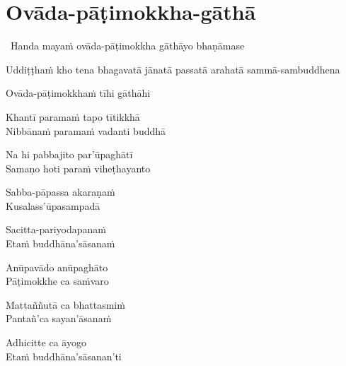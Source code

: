 \section{Ovāda-pāṭimokkha-gāthā}
\label{ovada-patimokkha-gatha}

\begin{intro}
  \anglebracketleft\ \hspace{-0.5mm}Handa mayaṁ ovāda-pāṭimokkha gāthāyo bhaṇāmase \hspace{-0.5mm}\anglebracketright\
\end{intro}

\medskip

\begin{pali-hang}
Uddiṭṭhaṁ kho tena bhagavatā jānatā passatā arahatā sammā-sambuddhena
\end{pali-hang}
Ovāda-pāṭimokkhaṁ tīhi gāthāhi
\begin{pali-hang}
Khantī paramaṁ tapo tītikkhā\\
Nibbānaṁ paramaṁ vadanti buddhā
\end{pali-hang}
\begin{pali-hang}
Na hi pabbajito par'ūpaghātī\\
Samaṇo hoti paraṁ viheṭhayanto
\end{pali-hang}
\begin{pali-hang}
Sabba-pāpassa akaraṇaṁ\\
Kusalass'ūpasampadā
\end{pali-hang}
\begin{pali-hang}
Sacitta-pariyodapanaṁ\\
Etaṁ buddhāna'sāsanaṁ
\end{pali-hang}
\begin{pali-hang}
Anūpavādo anūpaghāto\\
Pāṭimokkhe ca saṁvaro
\end{pali-hang}
\begin{pali-hang}
Mattaññutā ca bhattasmiṁ\\
Pantañ'ca sayan'āsanaṁ
\end{pali-hang}
\begin{pali-hang}
Adhicitte ca āyogo\\
Etaṁ buddhāna'sāsanan'ti
\end{pali-hang}

\clearpage
